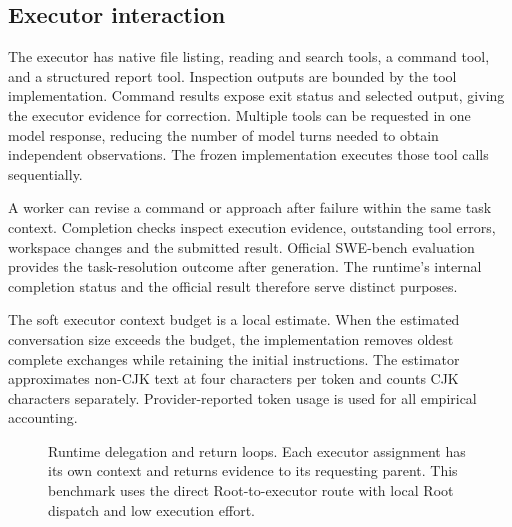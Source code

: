 \documentclass[10pt,a4paper]{article}
\begin{document}
\subsection{Executor interaction}

The executor has native file listing, reading and search tools, a command tool,
and a structured report tool. Inspection outputs are bounded by the tool
implementation. Command results expose exit status and selected output, giving
the executor evidence for correction. Multiple tools can be requested in one
model response, reducing the number of model turns needed to obtain independent
observations. The frozen implementation executes those tool calls sequentially.

A worker can revise a command or approach after failure within the same task
context. Completion checks inspect execution evidence, outstanding tool errors,
workspace changes and the submitted result. Official SWE-bench evaluation
provides the task-resolution outcome after generation. The runtime's internal
completion status and the official result therefore serve distinct purposes.

The soft executor context budget is a local estimate. When the estimated
conversation size exceeds the budget, the implementation removes oldest
complete exchanges while retaining the initial instructions. The estimator
approximates non-CJK text at four characters per token and counts CJK characters
separately. Provider-reported token usage is used for all empirical accounting.

\begin{figure}[ht]
\centering
{}
\caption{Runtime delegation and return loops. Each executor assignment has its
own context and returns evidence to its requesting parent. This benchmark uses
the direct Root-to-executor route with local Root dispatch and low execution
effort.}
\label{fig:path}
\end{figure}
\end{document}
